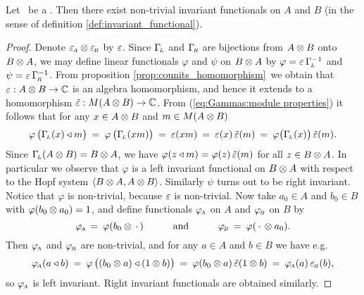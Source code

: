 \begin{prop_sec} \label{prop:existence:invariant_functionals}
Let\/ \pairAB\ be a \mhs\@.
Then there exist non-trivial invariant functionals on $A$ and\/ $B$
(in the sense of definition \ref{def:invariant_functional}).
\end{prop_sec}

\begin{proof}
Denote $\epsA \tens \epsB$ by $\eps$.
Since $\GamL$ and $\GamR$ are bijections from $A\tens B$ onto $B \tens A$,
we may define linear functionals $\varphi$ and $\psi$ on $B \tens A$ by
$\varphi = \eps \, \GamL^{-1}$ and $\psi = \eps \, \GamR^{-1}$.
From proposition \ref{prop:counits_homomorphism}\ we obtain that $\eps : A\tens B \rarr \kk$
is an algebra homomorphism, and hence it extends to a homomorphism
$\tilde{\eps} : M(A\tens B) \rarr \kk$.
From (\ref{eq:Gammas:module properties}) it follows that for any $x \in A\tens B$
and $m \in M(A\tens B)$
$$  \varphi \left( \GamL(x) \ract m \vertM\right)
       \:=\:  \varphi \left( \GamL(xm) \vertM\right)
       \:=\:  \eps(xm)
       \:=\:  \eps(x)\, \tilde{\eps}(m)
       \:=\:  \varphi\! \left( \GamL(x) \vertM\right) \tilde{\eps}(m).  $$
Since $\GamL(A\tens B)= B \tens A$, we have
$\varphi(z \ract m) = \varphi(z) \, \tilde{\eps}(m)$ for all $z\in B\tens A$.
In particular we observe that $\varphi$ is a left invariant functional on $B \tens A$
with respect to the Hopf system $\pair{B \tens A}{A\tens B}$.
Similarly $\psi$ turns out to be right invariant.
Notice that $\varphi$ is non-trivial, because $\eps$ is non-trivial.
Now take $a_0 \in A$ and $b_0\in B$ with $\varphi(b_0 \tens a_0) = 1$,
and define functionals $\phiA$ on $A$ and $\phiB$ on $B$ by
$$ \phiA \,=\: \varphi(b_0 \tens \,\cdot\,)   \andspace{3em}
   \phiB \,=\: \varphi(\,\cdot\, \tens a_0). $$
Then $\phiA$ and $\phiB$ are non-trivial,
and for any $a\in A$ and $b\in B$ we have e.g.
$$ \phiA(a \ract b)
      \:=\: \varphi\left((b_0 \tens a) \ract (1 \tens b) \vertM\right)
      \:=\: \varphi(b_0 \tens a)\, \tilde{\eps}(1 \tens b)
      \:=\: \phiA(a) \, \epsB(b),  $$
so $\phiA$ is left invariant. Right invariant functionals are obtained similarly.
\end{proof}



